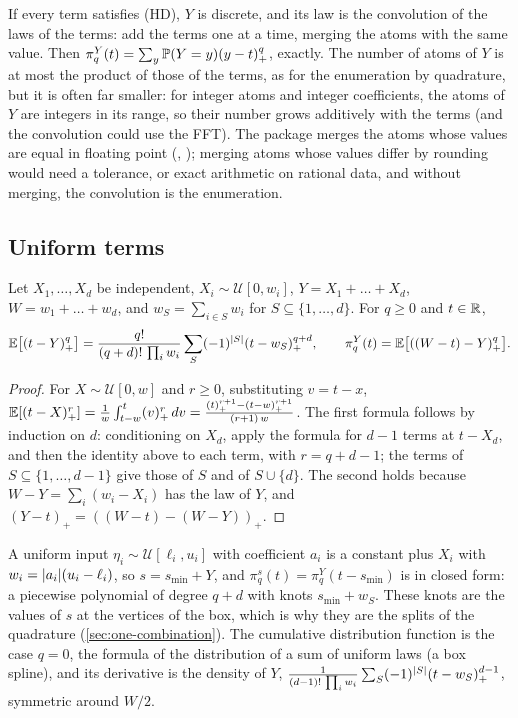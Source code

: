 \documentclass[11pt,a4paper]{article}
\numberwithin{equation}{section}
\newcommand{\pos}[1]{(#1)_+}            %
\newcommand{\slt}[2]{\pi^{#1}_{#2}}      %
\newcommand{\Hyp}[1]{\textup{(H#1)}}    %
\begin{document}
If every term satisfies \Hyp{D}, $Y$ is discrete, and its law is the convolution of the laws of the terms:
add the terms one at a time, merging the atoms with the same value.
Then $\slt Yq(t) = \sum_y \Prob(Y = y)\pos{y - t}^q$, exactly.
The number of atoms of $Y$ is at most the product of those of the terms, as for the enumeration by quadrature,
but it is often far smaller:
for integer atoms and integer coefficients, the atoms of $Y$ are integers in its range, so their number grows additively with the terms
(and the convolution could use the FFT).
The package merges the atoms whose values are equal in floating point (, );
merging atoms whose values differ by rounding would need a tolerance, or exact arithmetic on rational data,
and without merging, the convolution is the enumeration.

\subsection{Uniform terms}
\label{sec:sums-uniform}

\begin{proposition}
\label{prop:uniform-sum}
Let $X_1, \dots, X_d$ be independent, $X_i \sim \mathcal{U}[0, w_i]$, $Y = X_1 + \dots + X_d$, $W = w_1 + \dots + w_d$, and $w_S = \sum_{i \in S} w_i$ for $S \subseteq \{1, \dots, d\}$.
For $q \ge 0$ and $t \in \mathbb{R}$,
\[
\E\bigl[\pos{t - Y}^q\bigr] = \frac{q!}{(q + d)!\,\prod_i w_i}\sum_{S} (-1)^{\abs S}\pos{t - w_S}^{q+d},
\qquad
\slt Yq(t) = \E\bigl[\pos{(W - t) - Y}^q\bigr].
\]
\end{proposition}

\begin{proof}
For $X \sim \mathcal{U}[0, w]$ and $r \ge 0$, substituting $v = t - x$,
$\E[\pos{t - X}^r] = \frac1w\int_{t - w}^t \pos v^r\,dv = \frac{\pos t^{r+1} - \pos{t - w}^{r+1}}{(r + 1)\,w}$.
The first formula follows by induction on $d$:
conditioning on $X_d$, apply the formula for $d - 1$ terms at $t - X_d$, and then the identity above to each term, with $r = q + d - 1$;
the terms of $S \subseteq \{1, \dots, d-1\}$ give those of $S$ and of $S \cup \{d\}$.
The second holds because $W - Y = \sum_i (w_i - X_i)$ has the law of $Y$, and $\pos{Y - t} = \pos{(W - t) - (W - Y)}$.
\end{proof}

A uniform input $\eta_i \sim \mathcal{U}[\ell_i, u_i]$ with coefficient $a_i$ is a constant plus $X_i$ with $w_i = \lvert a_i \rvert(u_i - \ell_i)$,
so $s = s_{\min} + Y$, and $\slt sq(t) = \slt Yq(t - s_{\min})$ is in closed form: a piecewise polynomial of degree $q + d$ with knots $s_{\min} + w_S$.
These knots are the values of $s$ at the vertices of the box, which is why they are the splits of the quadrature (\cref{sec:one-combination}).
The cumulative distribution function is the case $q = 0$, the formula of the distribution of a sum of uniform laws (a box spline),
and its derivative is the density of $Y$, $\frac{1}{(d - 1)!\,\prod_i w_i}\sum_S (-1)^{\abs S}\pos{t - w_S}^{d-1}$, symmetric around $W/2$.
\end{document}
